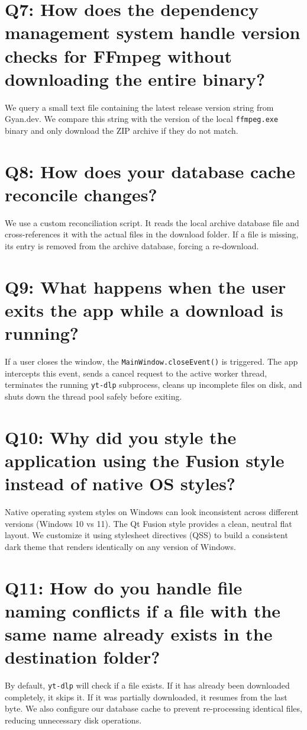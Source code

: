 \documentclass[12pt]{report}
\begin{document}
\section[Question 7]{Q7: How does the dependency management system handle version checks for FFmpeg without downloading the entire binary?}
We query a small text file containing the latest release version string from Gyan.dev. We compare this string with the version of the local \texttt{ffmpeg.exe} binary and only download the ZIP archive if they do not match.

\section[Question 8]{Q8: How does your database cache reconcile changes?}
We use a custom reconciliation script. It reads the local archive database file and cross-references it with the actual files in the download folder. If a file is missing, its entry is removed from the archive database, forcing a re-download.

\section[Question 9]{Q9: What happens when the user exits the app while a download is running?}
If a user closes the window, the \texttt{MainWindow.closeEvent()} is triggered. The app intercepts this event, sends a cancel request to the active worker thread, terminates the running \texttt{yt-dlp} subprocess, cleans up incomplete files on disk, and shuts down the thread pool safely before exiting.

\section[Question 10]{Q10: Why did you style the application using the Fusion style instead of native OS styles?}
Native operating system styles on Windows can look inconsistent across different versions (Windows 10 vs 11). The Qt Fusion style provides a clean, neutral flat layout. We customize it using stylesheet directives (QSS) to build a consistent dark theme that renders identically on any version of Windows.

\section[Question 11]{Q11: How do you handle file naming conflicts if a file with the same name already exists in the destination folder?}
By default, \texttt{yt-dlp} will check if a file exists. If it has already been downloaded completely, it skips it. If it was partially downloaded, it resumes from the last byte. We also configure our database cache to prevent re-processing identical files, reducing unnecessary disk operations.
\end{document}
